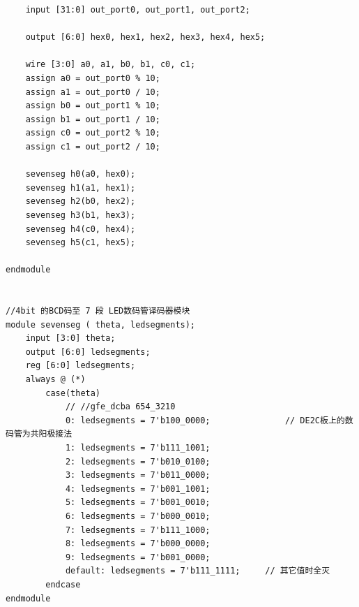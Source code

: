 \documentclass[UTF8]{ctexart}
\begin{document}
\begin{verbatim}
    input [31:0] out_port0, out_port1, out_port2;

    output [6:0] hex0, hex1, hex2, hex3, hex4, hex5;

    wire [3:0] a0, a1, b0, b1, c0, c1;
    assign a0 = out_port0 % 10;
    assign a1 = out_port0 / 10;
    assign b0 = out_port1 % 10;
    assign b1 = out_port1 / 10;
    assign c0 = out_port2 % 10;
    assign c1 = out_port2 / 10;

    sevenseg h0(a0, hex0);
    sevenseg h1(a1, hex1);
    sevenseg h2(b0, hex2);
    sevenseg h3(b1, hex3);
    sevenseg h4(c0, hex4);
    sevenseg h5(c1, hex5);

endmodule


//4bit 的BCD码至 7 段 LED数码管译码器模块
module sevenseg ( theta, ledsegments);
    input [3:0] theta;
    output [6:0] ledsegments;
    reg [6:0] ledsegments;
    always @ (*)
        case(theta)
            // //gfe_dcba 654_3210
            0: ledsegments = 7'b100_0000;				// DE2C板上的数码管为共阳极接法
            1: ledsegments = 7'b111_1001;
            2: ledsegments = 7'b010_0100;
            3: ledsegments = 7'b011_0000;
            4: ledsegments = 7'b001_1001;
            5: ledsegments = 7'b001_0010;
            6: ledsegments = 7'b000_0010;
            7: ledsegments = 7'b111_1000;
            8: ledsegments = 7'b000_0000;
            9: ledsegments = 7'b001_0000;
            default: ledsegments = 7'b111_1111; 	// 其它值时全灭
        endcase
endmodule


\end{verbatim}
\end{document}
